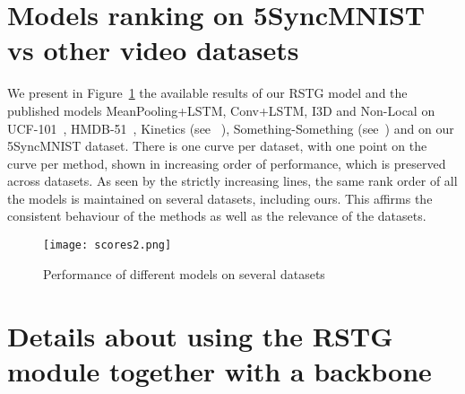 \documentclass{article}
\def\x{$\times$}
\begin{document}
\maketitle


\section{Models ranking on 5SyncMNIST vs other video datasets}
 \label{section:ranking}
    
  We present in Figure~\ref{fig:dataset_correlation} the available results of our RSTG model and the published models MeanPooling+LSTM, Conv+LSTM, I3D and Non-Local  on UCF-101~\cite{soomro2012ucf101},  HMDB-51~\cite{kuehne2011hmdb}, Kinetics (see ~\cite{carreira2017quo}), Something-Something (see~\cite{wang2018videos_gupta2}) and on our 5SyncMNIST dataset. There is one curve per dataset, with one point on the curve per method, shown in increasing order of performance, which is preserved across datasets. As seen by the strictly increasing lines, the same rank order of all the models is maintained on several datasets, including ours. This affirms the consistent behaviour of the methods as well as the relevance of the datasets.
         
         
    \begin{figure}[H]
        \centering
        \texttt{[image: scores2.png]}
        \caption{Performance of different models on several datasets}
        \label{fig:dataset_correlation}
    \end{figure}

\section{Details about using the RSTG module together with a backbone}

\newcommand{\graphiter}{\(\left[\begin{array}{c}\text{Temporal Processing Stage}\\[-.1em] \text{Spatial Processing Stage }\end{array}\right]\)\x3\\ & \\ & \text{Temporal Processing Stage}}
\end{document}
